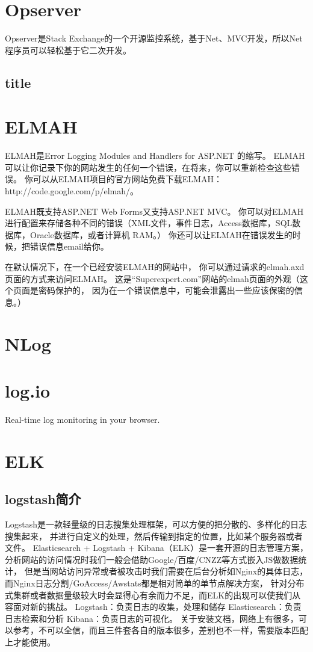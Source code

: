 \documentclass{book}
\begin{document}
\section{Opserver}

Opserver是Stack Exchange的一个开源监控系统，基于Net、MVC开发，所以Net程序员可以轻松基于它二次开发。

\subsection{title}



\section{ELMAH}

ELMAH是Error Logging Modules and Handlers for ASP.NET 的缩写。
ELMAH可以让你记录下你的网站发生的任何一个错误，在将来，你可以重新检查这些错误。
你可以从ELMAH项目的官方网站免费下载ELMAH：http://code.google.com/p/elmah/。

ELMAH既支持ASP.NET Web Forms又支持ASP.NET MVC。
你可以对ELMAH进行配置来存储各种不同的错误（XML文件，事件日志，Access数据库，SQL数据库，Oracle数据库，或者计算机 RAM。）
你还可以让ELMAH在错误发生的时候，把错误信息email给你。

在默认情况下，在一个已经安装ELMAH的网站中，
你可以通过请求的elmah.axd页面的方式来访问ELMAH。
这是“Superexpert.com”网站的elmah页面的外观（这个页面是密码保护的，
因为在一个错误信息中，可能会泄露出一些应该保密的信息。）

\section{NLog}

\section{log.io}

Real-time log monitoring in your browser.

\section{ELK}

\subsection{logstash简介}

Logstash是一款轻量级的日志搜集处理框架，可以方便的把分散的、多样化的日志搜集起来，
并进行自定义的处理，然后传输到指定的位置，比如某个服务器或者文件。
Elasticsearch + Logstash + Kibana（ELK）是一套开源的日志管理方案，
分析网站的访问情况时我们一般会借助Google/百度/CNZZ等方式嵌入JS做数据统计，
但是当网站访问异常或者被攻击时我们需要在后台分析如Nginx的具体日志，
而Nginx日志分割/GoAccess/Awstats都是相对简单的单节点解决方案，
针对分布式集群或者数据量级较大时会显得心有余而力不足，而ELK的出现可以使我们从容面对新的挑战。
Logstash：负责日志的收集，处理和储存
Elasticsearch：负责日志检索和分析
Kibana：负责日志的可视化。
关于安装文档，网络上有很多，可以参考，不可以全信，而且三件套各自的版本很多，差别也不一样，需要版本匹配上才能使用。
\end{document}
